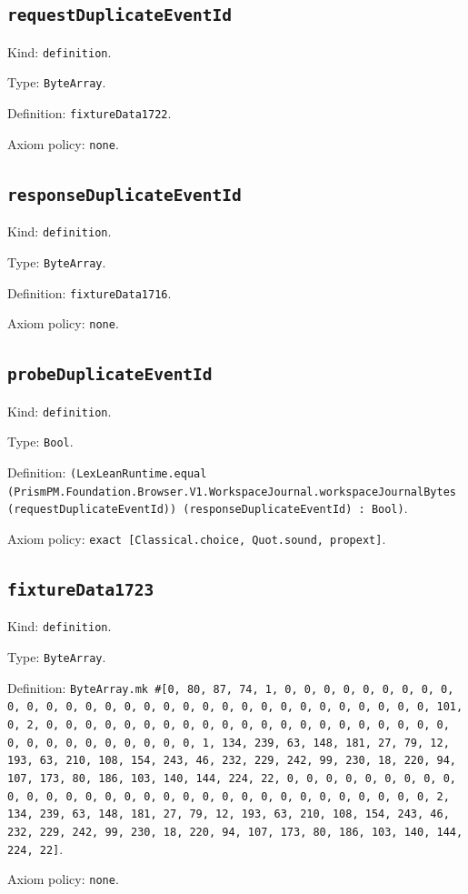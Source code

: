\documentclass[11pt]{article}
\begin{document}
\subsection*{\texttt{requestDuplicateEventId}}
\noindent Kind: \texttt{definition}.\par
\noindent Type: \texttt{ByteArray}.\par
\noindent Definition: \texttt{fixtureData1722}.\par
\noindent Axiom policy: \texttt{none}.\par
\subsection*{\texttt{responseDuplicateEventId}}
\noindent Kind: \texttt{definition}.\par
\noindent Type: \texttt{ByteArray}.\par
\noindent Definition: \texttt{fixtureData1716}.\par
\noindent Axiom policy: \texttt{none}.\par
\subsection*{\texttt{probeDuplicateEventId}}
\noindent Kind: \texttt{definition}.\par
\noindent Type: \texttt{Bool}.\par
\noindent Definition: \texttt{(LexLeanRuntime.equal (PrismPM.Foundation.Browser.V1.WorkspaceJournal.workspaceJournalBytes (requestDuplicateEventId)) (responseDuplicateEventId) : Bool)}.\par
\noindent Axiom policy: \texttt{exact [Classical.choice, Quot.sound, propext]}.\par
\subsection*{\texttt{fixtureData1723}}
\noindent Kind: \texttt{definition}.\par
\noindent Type: \texttt{ByteArray}.\par
\noindent Definition: \texttt{ByteArray.mk \#[0, 80, 87, 74, 1, 0, 0, 0, 0, 0, 0, 0, 0, 0, 0, 0, 0, 0, 0, 0, 0, 0, 0, 0, 0, 0, 0, 0, 0, 0, 0, 0, 0, 0, 0, 0, 101, 0, 2, 0, 0, 0, 0, 0, 0, 0, 0, 0, 0, 0, 0, 0, 0, 0, 0, 0, 0, 0, 0, 0, 0, 0, 0, 0, 0, 0, 0, 0, 0, 0, 1, 134, 239, 63, 148, 181, 27, 79, 12, 193, 63, 210, 108, 154, 243, 46, 232, 229, 242, 99, 230, 18, 220, 94, 107, 173, 80, 186, 103, 140, 144, 224, 22, 0, 0, 0, 0, 0, 0, 0, 0, 0, 0, 0, 0, 0, 0, 0, 0, 0, 0, 0, 0, 0, 0, 0, 0, 0, 0, 0, 0, 0, 0, 0, 2, 134, 239, 63, 148, 181, 27, 79, 12, 193, 63, 210, 108, 154, 243, 46, 232, 229, 242, 99, 230, 18, 220, 94, 107, 173, 80, 186, 103, 140, 144, 224, 22]}.\par
\noindent Axiom policy: \texttt{none}.\par
\end{document}
